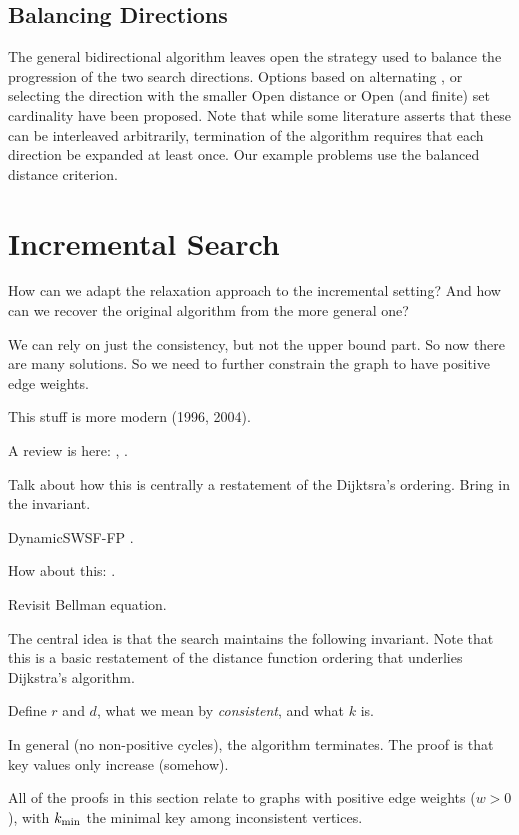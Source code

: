 \subsection{Balancing Directions}
The general bidirectional algorithm leaves open the strategy
used to balance the progression of the two search directions.
Options based on alternating \citep{dantzig1963linearprogramming},
or selecting the direction with the smaller {\sc Open} distance
\citep{nicholson1966shortest}
or {\sc Open} (and finite) set cardinality
\citep{pohl1969bidirectional}
have been proposed.
Note that while some literature asserts that
these can be interleaved arbitrarily,
termination of the algorithm requires that each direction
be expanded at least once.
Our example problems use the balanced distance criterion.

\section{Incremental Search}
\label{sec:ibid:incremental}

How can we adapt the relaxation approach to the incremental setting?
And how can we recover the original algorithm from the more general one?

We can rely on just the consistency,
but not the upper bound part.
So now there are many solutions.
So we need to further constrain the graph to have
positive edge weights.

This stuff is more modern (1996, 2004).

A review is here: \citep{eppstein1999dynamic},
\citep{demetrescu2010dynamic}.

Talk about how this is centrally a restatement of the Dijktsra's ordering.
Bring in the invariant.

DynamicSWSF-FP \citep{ramalingam1996dynamicswsffp}.

How about this: \citep{frigioni2000dynamicsp}.

Revisit Bellman equation.

The central idea is that the search maintains the following invariant.
Note that this is a basic restatement of the distance function
ordering that underlies Dijkstra's algorithm.

Define $r$ and $d$,
what we mean by \emph{consistent},
and what $k$ is.

In general (no non-positive cycles),
the algorithm terminates.
The proof is that key values only increase (somehow).

All of the proofs in this section relate to
graphs with positive edge weights ($w > 0$),
with $k_{\mbox{\scriptsize min}}$ the minimal key among inconsistent vertices.

